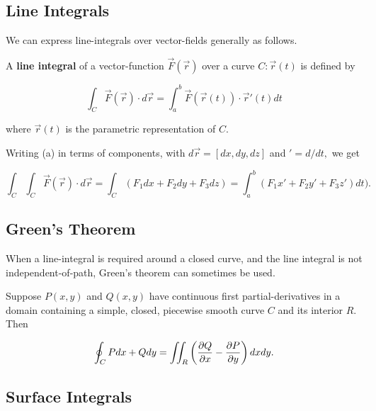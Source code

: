 \documentclass{article}
\begin{document}
\subsection{Line Integrals}

\begin{remark}
We can express \@{line-integrals} over \@{vector-fields} generally as follows.
\end{remark}

\begin{definition}
A \textbf{line integral} of a \@{vector-function} $\vec{F}(\vec{r})$ over a curve $C: \vec{r}(t)$ is defined by

\[ \int_{C} \vec{F}(\vec{r}) \cdot d \vec{r} = \int_{a}^{b} \vec{F}(\vec{r}(t)) \cdot \vec{r}'(t) dt \tag{a} \]

where $\vec{r}(t)$ is the parametric representation of $C.$

Writing (a) in terms of \@{components}, with $d \vec{r} = [dx, dy, dz]$ and $' = d/dt,$ we get

\[ \int_{C} \int_{C} \vec{F}(\vec{r}) \cdot d \vec{r} = \int_{C} (F_1 dx + F_2 dy + F_3 dz) = \int_{a}^{b} (F_1 x' + F_2 y' + F_3 z') dt). \]
\end{definition}

\subsection{Green's Theorem}

\begin{remark}
When a \@{line-integral} is required around a closed curve, and the line integral is not \@{independent-of-path}, Green's theorem can sometimes be used.
\end{remark}

\begin{theorem}\label{greens-theorem}
Suppose $P(x,y)$ and $Q(x,y)$ have \@{continuous} first \@{partial-derivatives} in a \@{domain} containing a simple, closed, piecewise \@{smooth} curve $C$ and its interior $R.$ Then

\[ \oint_C Pdx + Qdy = \iint_R \left(\frac{\partial Q}{\partial x} - \frac{\partial P}{\partial y}\right) dx dy. \]
\end{theorem}

\subsection{Surface Integrals}
\end{document}
